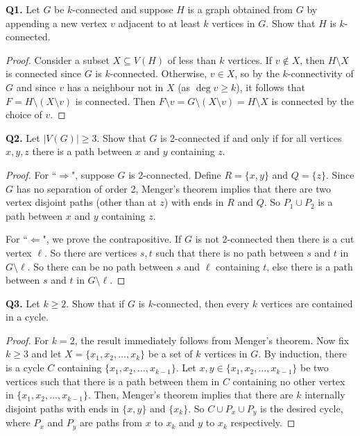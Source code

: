 \noindent \textbf{Q1.} Let $G$ be $k$-connected and suppose $H$ is a graph obtained from $G$ by appending a new vertex $v$ adjacent to at least $k$ vertices in $G$. Show that $H$ is $k$-connected.
\begin{proof}
Consider a subset $X \subseteq V(H)$ of less than \( k \) vertices. If $v \notin X$, then $H \setminus X$ is connected since $G$ is $k$-connected. Otherwise, $v \in X$, so by the $k$-connectivity of $G$ and since $v$ has a neighbour not in $X$ (as $\deg v \geq k$), it follows that $F = H \setminus (X \setminus v)$ is connected. Then $F \setminus v = G \setminus (X \setminus v) = H \setminus X $ is connected by the choice of $v$.
\end{proof}
\noindent \textbf{Q2.} Let \( |V(G)| \geq 3 \). Show that $G$ is 2-connected if and only if for all vertices $x,y,z$ there is a path between $x$ and $y$ containing $z$.
\begin{proof}
For ``$\Rightarrow$", suppose $G$ is 2-connected. Define \( R = \{ x,y \}  \) and \( Q = \{ z \}  \). Since \( G \) has no separation of order 2, Menger's theorem implies that there are two vertex disjoint paths (other than at \( z \)) with ends in \( R \) and \( Q \). So \( P_1 \cup P_2 \) is a path between \( x \) and \( y \) containing \( z \).

For ``$\Leftarrow$", we prove the contrapositive. If \( G \) is not 2-connected then there is a cut vertex \( \ell \). So there are vertices \( s,t \) such that there is no path between \( s \) and \( t \) in \( G \setminus \ell \). So there can be no path between \( s \) and \( \ell \) containing \( t \), else there is a path between \( s \) and \( t \) in \( G \setminus \ell \).
\end{proof}
\noindent \textbf{Q3.} Let \( k \geq 2 \). Show that if \( G \) is \( k \)-connected, then every \( k \) vertices are contained in a cycle.
\begin{proof}
	For \( k = 2 \), the result immediately follows from Menger's theorem. Now fix \( k \geq 3 \) and let \( X = \{ x_1, x_2, \hdots , x_{k}  \}  \) be a set of \( k \) vertices in \( G \). By induction, there is a cycle \( C \) containing \( \{ x_1, x_2, \hdots , x_{k-1}  \}  \). Let \( x, y \in \{ x_1, x_2, \hdots , x_{k-1}  \}  \) be two vertices such that there is a path between them in \( C \) containing no other vertex in \( \{ x_1, x_2, \hdots , x_{k-1}  \}  \). Then, Menger's theorem implies that there are \( k \) internally disjoint paths with ends in \( \{ x, y \}  \) and \( \{ x_{k}  \}  \). So \( C \cup P_{x} \cup P_{y}   \) is  the desired cycle, where \( P_{x}  \) and \( P_{y}  \) are paths from \( x \) to \( x_{k}  \) and \( y \) to \( x_{k}  \) respectively.
\end{proof}
